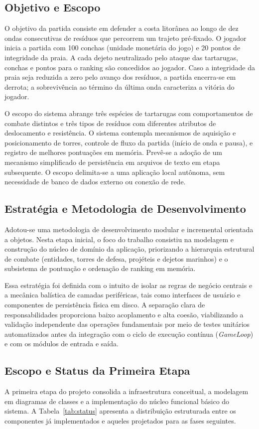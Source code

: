 \documentclass[11pt,a4paper]{article}
\begin{document}
\subsection*{Objetivo e Escopo}
O objetivo da partida consiste em defender a costa litorânea ao longo de dez ondas consecutivas de resíduos que percorrem um trajeto pré-fixado. O jogador inicia a partida com 100 conchas (unidade monetária do jogo) e 20 pontos de integridade da praia. A cada dejeto neutralizado pelo ataque das tartarugas, conchas e pontos para o ranking são concedidos ao jogador. Caso a integridade da praia seja reduzida a zero pelo avanço dos resíduos, a partida encerra-se em derrota; a sobrevivência ao término da última onda caracteriza a vitória do jogador.

O escopo do sistema abrange três espécies de tartarugas com comportamentos de combate distintos e três tipos de resíduos com diferentes atributos de deslocamento e resistência. O sistema contempla mecanismos de aquisição e posicionamento de torres, controle de fluxo da partida (início de onda e pausa), e registro de melhores pontuações em memória. Prevê-se a adoção de um mecanismo simplificado de persistência em arquivos de texto em etapa subsequente. O escopo delimita-se a uma aplicação local autônoma, sem necessidade de banco de dados externo ou conexão de rede.

\subsection*{Estratégia e Metodologia de Desenvolvimento}
Adotou-se uma metodologia de desenvolvimento modular e incremental orientada a objetos. Nesta etapa inicial, o foco do trabalho consistiu na modelagem e construção do núcleo de domínio da aplicação, priorizando a hierarquia estrutural de combate (entidades, torres de defesa, projéteis e dejetos marinhos) e o subsistema de pontuação e ordenação de ranking em memória.

Essa estratégia foi definida com o intuito de isolar as regras de negócio centrais e a mecânica balística de camadas periféricas, tais como interfaces de usuário e componentes de persistência física em disco. A separação clara de responsabilidades proporciona baixo acoplamento e alta coesão, viabilizando a validação independente das operações fundamentais por meio de testes unitários automatizados antes da integração com o ciclo de execução contínua (\textit{GameLoop}) e com os módulos de entrada e saída.

\subsection*{Escopo e Status da Primeira Etapa}
A primeira etapa do projeto consolida a infraestrutura conceitual, a modelagem em diagramas de classes e a implementação do núcleo funcional básico do sistema. A Tabela~\ref{tab:status} apresenta a distribuição estruturada entre os componentes já implementados e aqueles projetados para as fases seguintes.
\end{document}

